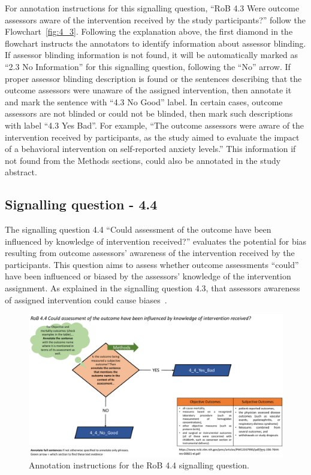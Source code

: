 \documentclass[sn-mathphys,Numbered]{sn-jnl}%
\begin{document}
For annotation instructions for this signalling question, ``RoB 4.3 Were outcome assessors aware of the intervention received by the study participants?'' follow the Flowchart~\ref{fig:4_3}.
Following the explanation above, the first diamond in the flowchart instructs the annotators to identify information about assessor blinding. 
If assessor blinding information is not found, it will be automatically marked as ``2.3 No Information'' for this signalling question, following the  ``No'' arrow.
If proper assessor blinding description is found or the sentences describing that the outcome assessors were unaware of the assigned intervention, then annotate it and mark the sentence with ``4.3 No Good'' label.
In certain cases, outcome assessors are not blinded or could not be blinded, then mark such descriptions with label ``4.3 Yes Bad''.
For example, ``The outcome assessors were aware of the intervention received by participants, as the study aimed to evaluate the impact of a behavioral intervention on self-reported anxiety levels.''
This information if not found from the Methods sections, could also be annotated in the study abstract.

%
%
%
\subsection*{Signalling question - 4.4 }
\label{subsec:4_4}
%
The signalling question 4.4 ``Could assessment of the outcome have been influenced by knowledge of intervention received?'' evaluates the potential for bias resulting from outcome assessors' awareness of the intervention received by the participants.
This question aims to assess whether outcome assessments ``could'' have been influenced or biased by the assessors' knowledge of the intervention assignment.
As explained in the signalling question 4.3, that assessors awareness of assigned intervention could cause biases~\cite{watanabe2022treatment,hrobjartsson2013observer,dimitrova2017acupuncture}.

%
%
%
\begin{figure}[hbt]
    \centering
    \includegraphics[width=\textwidth]{figures/4_4.pdf}
    \caption{Annotation instructions for the RoB 4.4 signalling question.}
    \label{fig:4_4}
\end{figure}
\end{document}
